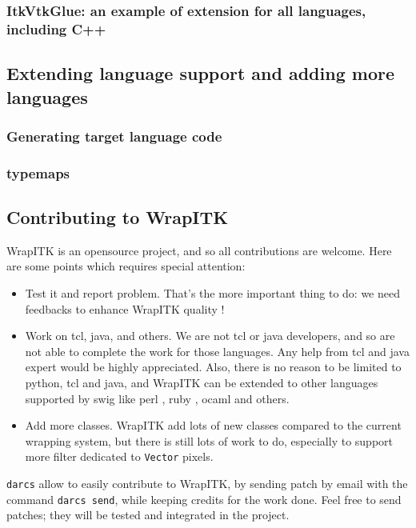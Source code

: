 \documentclass{InsightArticle}
\begin{document}
    \subsubsection{ItkVtkGlue: an example of extension for all languages, including C++}

  \subsection{Extending language support and adding more languages}

    \subsubsection{Generating target language code}

    \subsubsection{typemaps}

  \subsection{Contributing to WrapITK}

WrapITK is an opensource project, and so all contributions are welcome. Here are
some points which requires special attention:
\begin{itemize}
  \item Test it and report problem. That's the more important thing to do:
we need feedbacks to enhance WrapITK quality !
  \item Work on tcl, java, and others. We are not tcl or java developers, and so
are not able to complete the work for those languages. Any help from tcl and
java expert would be highly appreciated. Also, there is no reason to be limited
to python, tcl and java, and WrapITK can be extended to other languages supported
by swig like perl \cite{PerlWebSite}, ruby \cite{RubyWebSite}, ocaml \cite{OcamlWebSite} and others.
  \item Add more classes. WrapITK add lots of new classes compared to the current
wrapping system, but there is still lots of work to do, especially to support more
filter dedicated to \verb$Vector$ pixels.
\end{itemize}

\verb$darcs$ \cite{DarcsWebSite} allow to easily contribute to WrapITK, by sending patch by email with
the command \verb$darcs send$, while keeping credits for the work done.
Feel free to send patches; they will be tested and integrated in the project.
\end{document}
